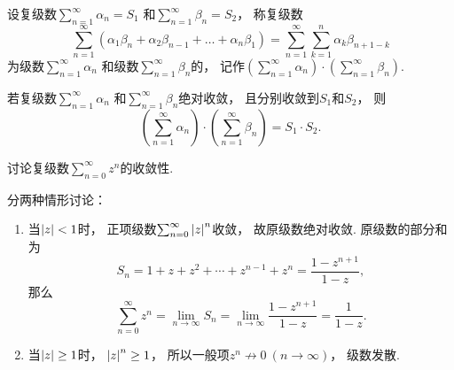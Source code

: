 \begin{definition}
设复级数\(\sum_{n=1}^\infty \alpha_n = S_1\)
和\(\sum_{n=1}^\infty \beta_n = S_2\)，
称复级数\begin{equation*}
	\sum_{n=1}^\infty (
		\alpha_1 \beta_n + \alpha_2 \beta_{n-1} + \dotsc + \alpha_n \beta_1
	)
	= \sum_{n=1}^\infty
		\sum_{k=1}^n \alpha_k \beta_{n+1-k}
\end{equation*}为级数\(\sum_{n=1}^\infty \alpha_n\)
和级数\(\sum_{n=1}^\infty \beta_n\)的，
记作\(\left( \sum_{n=1}^\infty \alpha_n \right) \cdot \left( \sum_{n=1}^\infty \beta_n \right)\).
\end{definition}

\begin{theorem}
若复级数\(\sum_{n=1}^\infty \alpha_n\)
和\(\sum_{n=1}^\infty \beta_n\)绝对收敛，
且分别收敛到\(S_1\)和\(S_2\)，
则\begin{equation*}
	\left( \sum_{n=1}^\infty \alpha_n \right)
	\cdot \left( \sum_{n=1}^\infty \beta_n \right)
	= S_1 \cdot S_2.
\end{equation*}
\end{theorem}

\begin{example}[复等比级数]\label{example:解析级数的级数表示.复等比级数}
讨论复级数\(\sum_{n=0}^\infty z^n\)的收敛性.
\begin{solution}
分两种情形讨论：\begin{enumerate}
	\item 当\(\abs{z} < 1\)时，
	正项级数\(\sum_{n=0}^\infty \abs{z}^n\)收敛，
	故原级数绝对收敛.
	原级数的部分和为\begin{equation*}
		S_n
		= 1 + z + z^2 + \dotsb + z^{n-1} + z^n
		= \frac{1-z^{n+1}}{1-z},
	\end{equation*}
	那么\begin{equation*}
		\sum_{n=0}^\infty z^n
		= \lim_{n\to\infty} S_n
		= \lim_{n\to\infty} \frac{1-z^{n+1}}{1-z}
		= \frac{1}{1-z}.
	\end{equation*}

	\item 当\(\abs{z} \geq 1\)时，
	\(\abs{z}^n \geq 1\)，
	所以一般项\(z^n \not\to 0\ (n\to\infty)\)，
	级数发散.
\end{enumerate}
\end{solution}
\end{example}
